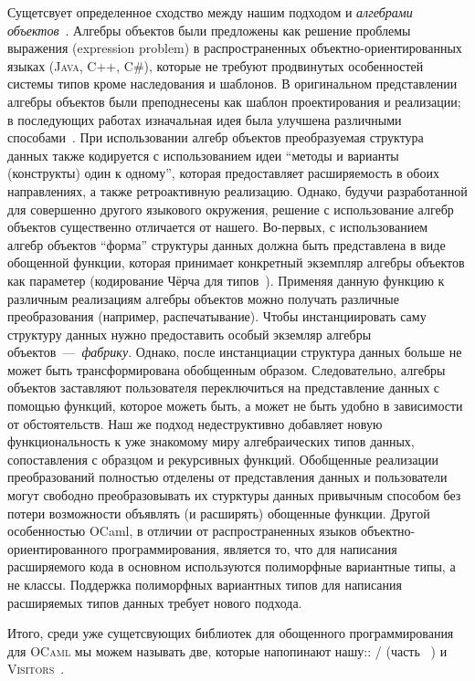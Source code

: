 Сущетсвует определенное сходство между нашим подходом и \emph{алгебрами объектов}~\cite{ObjectAlgebras}. Алгебры объектов были предложены как решение проблемы выражения (expression problem) в распространенных объектно-ориентированных языках  (\textsc{Java}, \textsc{C++}, \textsc{C\#}), которые не требуют продвинутых особенностей системы типов кроме наследования и шаблонов. В оригинальном представлении алгебры объектов были преподнесены как шаблон проектирования и реализации; в последующих работах изначальная идея была улучшена различными способами~\cite{ObjectAlgebrasAttribute,ObjectAlgebrasSYB}. При использовании алгебр объектов преобразуемая структура данных также кодируется с использованием идеи ``методы и варианты (конструкты) один к одному'', которая предоставляет расширяемость в обоих направлениях, а также ретроактивную реализацию. Однако, будучи  разработанной для совершенно другого языкового окружения, решение с использование алгебр объектов существенно отличается от нашего. Во-первых, с использованием алгебр объектов ``форма'' структуры данных должна быть представлена в виде обощенной функции, которая принимает конкретный экземпляр алгебры объектов как параметер (кодирование Чёрча для типов~\cite{Hinze}). Применяя данную функцию к различным реализациям алгебры объектов можно получать различные преобразования (например, распечатывание). Чтобы инстанциировать саму структуру данных нужно предоставить особый экземляр алгебры объектов~---~\emph{фабрику}. Однако, после инстанциации структура данных больше не может быть трансформирована обобщенным образом. Следовательно, алгебры объектов заставляют пользователя переключиться на представление данных с помощью функций, которое можеть быть, а может не быть удобно в зависимости от обстоятельств.  Наш же подход недеструктивно добавляет новую функциональность к уже знакомому миру алгебраических типов данных, сопоставления с образцом и рекурсивных функций. Обобщенные реализации преобразований полностью отделены от представления данных и пользователи могут свободно преобразовывать их стурктуры данных привычным способом  без потери возможности объявлять (и расширять) обощенные функции. Другой особенностью OCaml, в отличии от распространенных языков объектно-ориентированного программирования, является то, что для написания расширяемого кода в основном используются полиморфные вариантные типы, а не классы. Поддержка полиморфных вариантных типов для написания расширяемых типов данных требует нового подхода.


Итого, среди уже сущетсвующих библиотек для обощенного программирования для \textsc{OCaml} мы можем называть две, которые напопинают нашу:: / (часть ~\cite{PPXLib}) и \textsc{Visitors}~\cite{Visitors}.


